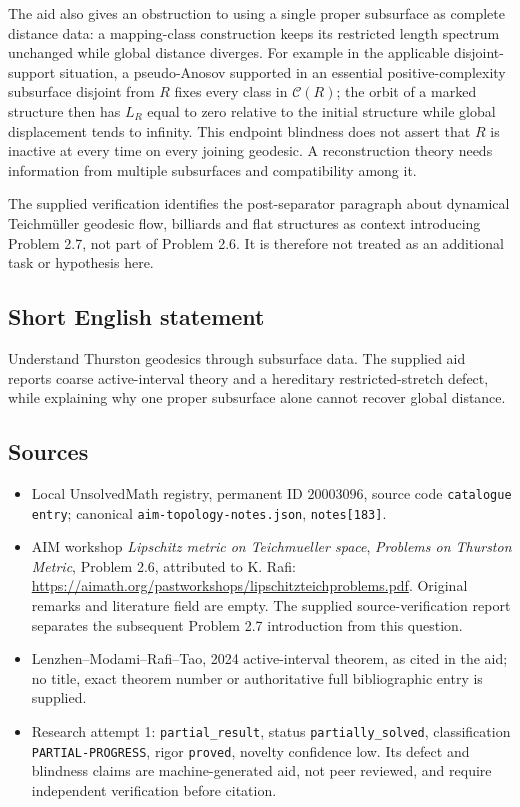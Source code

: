 \documentclass[11pt]{article}
\begin{document}
The aid also gives an obstruction to using a single proper subsurface as complete distance data: a mapping-class construction keeps its restricted length spectrum unchanged while global distance diverges. For example in the applicable disjoint-support situation, a pseudo-Anosov supported in an essential positive-complexity subsurface disjoint from $R$ fixes every class in $\mathcal C(R)$; the orbit of a marked structure then has $L_R$ equal to zero relative to the initial structure while global displacement tends to infinity. This endpoint blindness does not assert that $R$ is inactive at every time on every joining geodesic. A reconstruction theory needs information from multiple subsurfaces and compatibility among it.

The supplied verification identifies the post-separator paragraph about dynamical Teichm\"uller geodesic flow, billiards and flat structures as context introducing Problem 2.7, not part of Problem 2.6. It is therefore not treated as an additional task or hypothesis here.
\subsection{Short English statement}
Understand Thurston geodesics through subsurface data. The supplied aid reports coarse active-interval theory and a hereditary restricted-stretch defect, while explaining why one proper subsurface alone cannot recover global distance.
\subsection{Sources}
\begin{itemize}
\item Local UnsolvedMath registry, permanent ID $20003096$, source code \texttt{catalogue entry}; canonical \texttt{aim-topology-notes.json}, \texttt{notes[183]}.
\item AIM workshop \emph{Lipschitz metric on Teichmueller space}, \emph{Problems on Thurston Metric}, Problem 2.6, attributed to K. Rafi: \url{https://aimath.org/pastworkshops/lipschitzteichproblems.pdf}. Original remarks and literature field are empty. The supplied source-verification report separates the subsequent Problem 2.7 introduction from this question.
\item Lenzhen--Modami--Rafi--Tao, 2024 active-interval theorem, as cited in the aid; no title, exact theorem number or authoritative full bibliographic entry is supplied.
\item Research attempt 1: \texttt{partial\_result}, status \texttt{partially\_solved}, classification \texttt{PARTIAL-PROGRESS}, rigor \texttt{proved}, novelty confidence low. Its defect and blindness claims are machine-generated aid, not peer reviewed, and require independent verification before citation.
\end{itemize}
\end{document}
